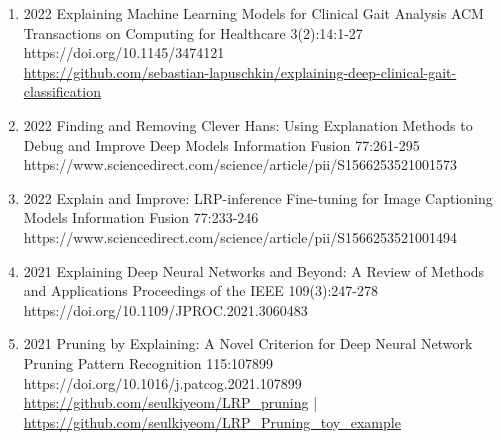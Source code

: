 \documentclass[10pt,a4paper]{article} %
\begin{document}
{\begin{enumerate}
    \item {}
                        {2022}
                        {Explaining Machine Learning Models for Clinical Gait Analysis}
                        {ACM Transactions on Computing for Healthcare}
                        {3(2):14:1-27}
                        {https://doi.org/10.1145/3474121}
                        {\\\href{https://github.com/sebastian-lapuschkin/explaining-deep-clinical-gait-classification}{https://github.com/sebastian-lapuschkin/explaining-deep-clinical-gait-classification}}


    \item {}
                        {2022}
                        {Finding and Removing Clever Hans: Using Explanation Methods to Debug and Improve Deep Models}
                        {Information Fusion}
                        {77:261-295}
                        {https://www.sciencedirect.com/science/article/pii/S1566253521001573}


    \item {}
                       {2022}
                       {Explain and Improve: LRP-inference Fine-tuning for Image Captioning Models}
                       {Information Fusion}
                       {77:233-246}
                       {https://www.sciencedirect.com/science/article/pii/S1566253521001494}

    \item {}
                        {2021}
                        {Explaining Deep Neural Networks and Beyond: A Review of Methods and Applications}
                        {Proceedings of the IEEE}
                        {109(3):247-278}
                        {https://doi.org/10.1109/JPROC.2021.3060483}

    \item {}
                        {2021}
                        {Pruning by Explaining: A Novel Criterion for Deep Neural Network Pruning}
                        {Pattern Recognition}
                        {115:107899}
                        {https://doi.org/10.1016/j.patcog.2021.107899}
                        {\\\href{https://github.com/seulkiyeom/LRP_pruning}{https://github.com/seulkiyeom/LRP\_pruning}
                         | \href{https://github.com/seulkiyeom/LRP_Pruning_toy_example}{https://github.com/seulkiyeom/LRP\_Pruning\_toy\_example}}


\end{enumerate}}
\end{document}
